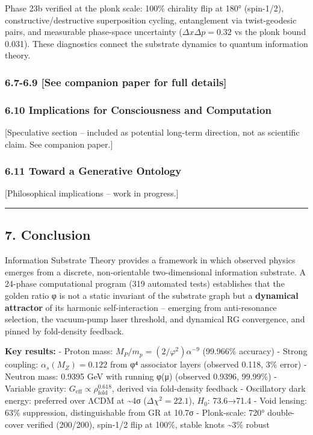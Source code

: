 \documentclass[
]{article}
\begin{document}
Phase 23b verified at the plonk scale: 100\% chirality flip at 180°
(spin-1/2), constructive/destructive superposition cycling, entanglement
via twist-geodesic pairs, and measurable phase-space uncertainty
(\(\Delta x \Delta p = 0.32\) vs the plonk bound 0.031). These
diagnostics connect the substrate dynamics to quantum information
theory.

\subsubsection{6.7-6.9 {[}See companion paper for full
details{]}}\label{see-companion-paper-for-full-details}

\subsubsection{6.10 Implications for Consciousness and
Computation}\label{implications-for-consciousness-and-computation}

{[}Speculative section -- included as potential long-term direction, not
as scientific claim. See companion paper.{]}

\subsubsection{6.11 Toward a Generative
Ontology}\label{toward-a-generative-ontology}

{[}Philosophical implications -- work in progress.{]}

\begin{center}\rule{0.5\linewidth}{0.5pt}\end{center}

\subsection{7. Conclusion}\label{conclusion}

Information Substrate Theory provides a framework in which observed
physics emerges from a discrete, non-orientable two-dimensional
information substrate. A 24-phase computational program (319 automated
tests) establishes that the golden ratio φ is not a static invariant of
the substrate graph but a \textbf{dynamical attractor} of its harmonic
self-interaction -- emerging from anti-resonance selection, the
vacuum-pump laser threshold, and dynamical RG convergence, and pinned by
fold-density feedback.

\textbf{Key results:} - Proton mass:
\(M_P/m_p = (2/\varphi^2)\alpha^{-9}\) (99.966\% accuracy) - Strong
coupling: \(\alpha_s(M_Z) = 0.122\) from φ⁴ associator layers (observed
0.118, 3\% error) - Neutron mass: 0.9395 GeV with running φ(μ) (observed
0.9396, 99.99\%) - Variable gravity:
\(G_{\text{eff}} \propto \rho_{\text{fold}}^{0.618}\), derived via
fold-density feedback - Oscillatory dark energy: preferred over ΛCDM at
\textasciitilde4σ (\(\Delta\chi^2 = 22.1\)), \(H_0\): 73.6→71.4 - Void
lensing: 63\% suppression, distinguishable from GR at 10.7σ -
Plonk-scale: 720° double-cover verified (200/200), spin-1/2 flip at
100\%, stable knots \textasciitilde3\% robust
\end{document}

